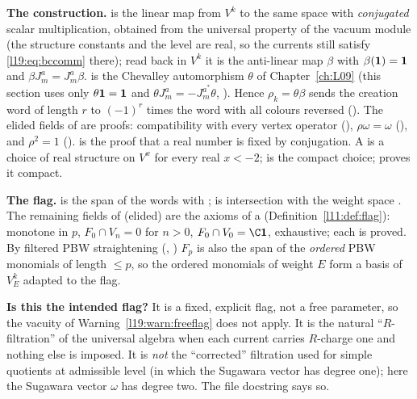 \begin{dictionary}
\textbf{The construction.}  is the linear map from $V^k$ to the same space with
\emph{conjugated} scalar multiplication, obtained from the universal property of the vacuum module (the
structure constants and the level are real, so the currents still satisfy \eqref{l19:eq:bccomm} there); read back
in $V^k$ it is the anti-linear map $\beta$ with $\beta(\mathbf{1}) = \mathbf{1}$ and $\beta J^a_m = J^a_m\beta$.
 is the Chevalley automorphism $\theta$ of Chapter~\ref{ch:L09}
(this section uses only $\theta\mathbf{1} = \mathbf{1}$ and $\theta J^a_m = -J^{a^*}_m\theta$,
). Hence $\rho_k = \theta\beta$ sends the creation word of length $r$ to $(-1)^r$
times the word with all colours reversed (). The elided fields of
 are proofs: compatibility with every vertex operator (), $\rho\omega = \omega$
(), and $\rho^2 = 1$ ().  is the proof that
a real number is fixed by conjugation. A  is a choice of real structure on $V^x$ for every real
$x<-2$;  is the compact choice;  proves it compact.

\textbf{The flag.}  is the span of the words with ;
 is intersection with the weight space . The remaining fields of
 (elided) are the axioms of a  (Definition~\ref{l11:def:flag}): monotone in
$p$, $F_0\cap V_n = 0$ for $n>0$, $F_0\cap V_0 = \C\lnineteenvac$, exhaustive; each is proved. By filtered PBW
straightening (, ) $F_p$ is also the
span of the \emph{ordered} PBW monomials of length $\le p$, so the ordered monomials of weight $E$ form a basis of
$V^k_E$ adapted to the flag.

\textbf{Is this the intended flag?} It is a fixed, explicit flag, not a free parameter, so the vacuity of
Warning~\ref{l19:warn:freeflag} does not apply. It is the natural ``$R$-filtration'' of the universal algebra
when each current carries $R$-charge one and nothing else is imposed. It is \emph{not} the ``corrected''
filtration used for simple quotients at admissible level (in which the Sugawara vector has degree one); here
the Sugawara vector $\omega$ has degree two. The file docstring says so.
\end{dictionary}

